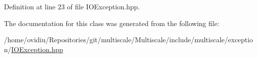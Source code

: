 \-Definition at line 23 of file \-I\-O\-Exception.\-hpp.



\-The documentation for this class was generated from the following file\-:\begin{DoxyCompactItemize}
\item 
/home/ovidiu/\-Repositories/git/multiscale/\-Multiscale/include/multiscale/exception/\hyperlink{IOException_8hpp}{\-I\-O\-Exception.\-hpp}\end{DoxyCompactItemize}
